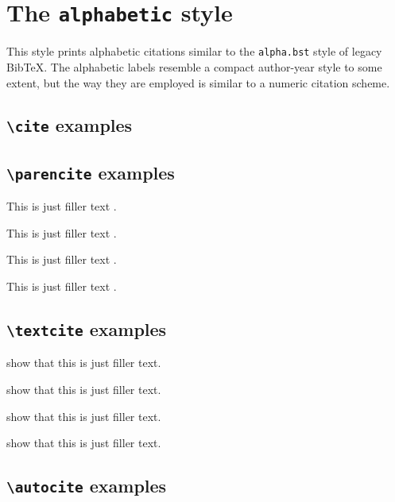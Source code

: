 \documentclass[a4paper]{article}
\newcommand{\cmd}[1]{\texttt{\textbackslash #1}}
\begin{document}
\section*{The \texttt{alphabetic} style}

This style prints alphabetic citations similar to the
\texttt{alpha.bst} style of legacy BibTeX. The alphabetic labels
resemble a compact author-year style to some extent, but the way
they are employed is similar to a numeric citation scheme.

\subsection*{\cmd{cite} examples}

\cite{companion}

\cite[59]{companion}

\cite[see][]{companion}

\cite[see][59--63]{companion}

\subsection*{\cmd{parencite} examples}


This is just filler text \parencite{companion}.

This is just filler text \parencite[59]{companion}.

This is just filler text \parencite[see][]{companion}.

This is just filler text \parencite[see][59--63]{companion}.

\subsection*{\cmd{textcite} examples}

\textcite{companion} show that this is just filler text.

\textcite[59]{companion} show that this is just filler text.

\textcite[see][]{companion} show that this is just filler text.

\textcite[see][59--63]{companion} show that this is just filler text.

\subsection*{\cmd{autocite} examples}
\end{document}
